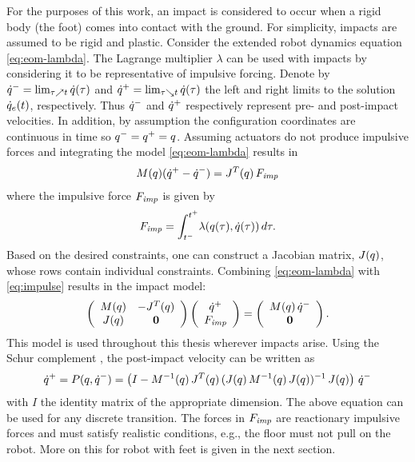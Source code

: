 For the purposes of this work, an impact is considered to occur when a rigid
body (the foot) comes into contact with the ground.
%
For simplicity, impacts are assumed to be rigid and plastic.
%
Consider the extended robot dynamics equation \eqref{eq:eom-lambda}.
%
The Lagrange multiplier $\lambda$ can be used with impacts by considering it to
be representative of impulsive forcing.
%
Denote by $\dot{q}^{-} = \lim_{\tau \nearrow t} \dot{q}(\tau)$ and $\dot{q}^{+} = \lim_{\tau
  \searrow t} \dot{q}(\tau)$ the left and right limits to the solution
$\dot{q}_{e}(t)$, respectively.
%
Thus $\dot{q}^{-}$ and $\dot{q}^{+}$ respectively represent pre- and post-impact velocities.
%
In addition, by assumption the configuration coordinates are continuous in time
so $q^{-} = q^{+} = q$.
%
Assuming actuators do not produce impulsive forces and integrating the model
\eqref{eq:eom-lambda} results in
\begin{align}
  \label{eq:impulse}
  M(q)(\dot{q}^{+} - \dot{q}^{-}) = J^{T}(q) \, F_{\mathit{imp}}
\end{align}
where the impulsive force $F_{\mathit{imp}}$ is given by
\begin{align*}
  F_{\mathit{imp}} = \int_{t^{-}}^{t^{+}} \! \lambda(q(\tau), \dot{q}(\tau)) \, d\tau.
\end{align*}
%
Based on the desired constraints, one can construct a Jacobian matrix,
$J(q)$, whose rows contain individual constraints.
%
Combining \eqref{eq:eom-lambda} with \eqref{eq:impulse} results in the impact
model:
%
\begin{align}
  \left(\begin{array}{c c}
      M(q) & -J^{T}(q)\\
      J(q) & {\mathbf 0}
    \end{array}\right)
  \left(\begin{array}{c}
      \dot{q}^{+}\\
      F_{\mathit{imp}}
    \end{array}\right) =
  \left(\begin{array}{c}
      M(q) \, \dot{q}^{-}\\
      {\mathbf 0}
    \end{array}\right).
  \label{eq:impact-model}
\end{align}
%
This model is used throughout this thesis wherever impacts arise.
%
Using the Schur complement \cite{Zhang2005}, the post-impact velocity can be
written as
%
\begin{align}
  \label{eq:pmap}
  \dot{q}^{+} = P(q, \dot{q}^{-}) = \left(I - M^{-1}(q) \, J^{T}(q) \,
    (J(q) \, M^{-1}(q) \, J(q))^{-1} \, J(q) \right) \,
  \dot{q}^{-}
\end{align}
%
with $I$ the identity matrix of the appropriate dimension.
%
The above equation can be used for any discrete transition.
%
The forces in $F_{\mathit{imp}}$ are reactionary impulsive forces and must satisfy
realistic conditions, e.g., the floor must not pull on the robot.
%
More on this for robot with feet is given in the next section.


